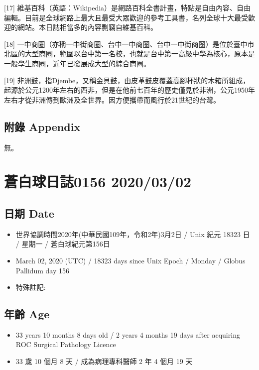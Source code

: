 \documentclass[a5paper, 11pt
]{book}
\providecommand{\tightlist}{%
  \setlength{\itemsep}{0pt}\setlength{\parskip}{0pt}}
\begin{document}
{[}17{]}
維基百科（英語：Wikipedia）是網路百科全書計畫，特點是自由內容、自由編輯。目前是全球網路上最大且最受大眾歡迎的參考工具書，名列全球十大最受歡迎的網站。本日誌相當多的內容剽竊自維基百科。

{[}18{]}
一中商圈（亦稱一中街商圈、台中一中商圈、台中一中街商圈）是位於臺中市北區的大型商圈，範圍以台中第一名校，也就是台中第一高級中學為核心，原本是一般學生商圈，近年已發展成大型的綜合商圈。

{[}19{]}
非洲鼓，指Djembe，又稱金貝鼓，由皮革鼓皮覆蓋高腳杯狀的木箱所組成，起源於公元1200年左右的西非，但是在他前七百年的歷史僅見於非洲，公元1950年左右才從非洲傳到歐洲及全世界。因方便攜帶而風行於21世紀的台灣。

\hypertarget{ux9644ux9304-appendix}{%
\subsection{附錄 Appendix}\label{ux9644ux9304-appendix}}

無。

\hypertarget{ux84bcux767dux7403ux65e5ux8a8c0156-20200302}{%
\section{蒼白球日誌0156
2020/03/02}\label{ux84bcux767dux7403ux65e5ux8a8c0156-20200302}}

\hypertarget{ux65e5ux671f-date-1}{%
\subsection{日期 Date}\label{ux65e5ux671f-date-1}}

\begin{itemize}
\tightlist
\item
  世界協調時間2020年(中華民國109年，令和2年)3月2日 / Unix 紀元 18323 日
  / 星期一 / 蒼白球紀元第156日
\item
  March 02, 2020 (UTC) / 18323 days since Unix Epoch / Monday / Globus
  Pallidum day 156
\item
  特殊註記:
\end{itemize}

\hypertarget{ux5e74ux9f61-age-1}{%
\subsection{年齡 Age}\label{ux5e74ux9f61-age-1}}

\begin{itemize}
\tightlist
\item
  33 years 10 months 8 days old / 2 years 4 months 19 days after
  acquiring ROC Surgical Pathology Licence
\item
  33 歲 10 個月 8 天 / 成為病理專科醫師 2 年 4 個月 19 天
\end{itemize}
\end{document}
